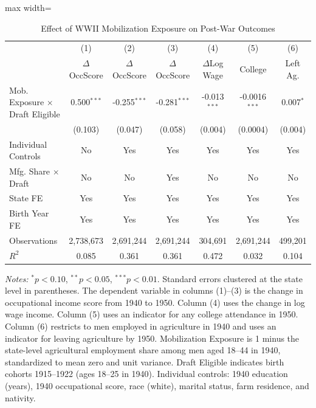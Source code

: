 \begin{table}[htbp]
\centering
\caption{Effect of WWII Mobilization Exposure on Post-War Outcomes}
\label{tab:main_results}
\begin{adjustbox}{max width=\textwidth}
\begin{tabular}{lcccccc}
\toprule
 & (1) & (2) & (3) & (4) & (5) & (6) \\
 & $\Delta$OccScore & $\Delta$OccScore & $\Delta$OccScore & $\Delta$Log Wage & College & Left Ag. \\
\midrule
Mob. Exposure $\times$ Draft Eligible & 0.500$^{***}$ & -0.255$^{***}$ & -0.281$^{***}$ & -0.013$^{***}$ & -0.0016$^{***}$ & 0.007$^{*}$ \\
 & (0.103) & (0.047) & (0.058) & (0.004) & (0.0004) & (0.004) \\
\midrule
Individual Controls & No & Yes & Yes & Yes & Yes & Yes \\
Mfg. Share $\times$ Draft & No & No & Yes & No & No & No \\
State FE & Yes & Yes & Yes & Yes & Yes & Yes \\
Birth Year FE & Yes & Yes & Yes & Yes & Yes & Yes \\
\midrule
Observations & 2,738,673 & 2,691,244 & 2,691,244 & 304,691 & 2,691,244 & 499,201 \\
$R^2$ & 0.085 & 0.361 & 0.361 & 0.472 & 0.032 & 0.104 \\
\bottomrule
\end{tabular}
\end{adjustbox}
\begin{tablenotes}
\small
\item \textit{Notes:} $^{*}p<0.10$, $^{**}p<0.05$, $^{***}p<0.01$. Standard errors clustered at the state level in parentheses. The dependent variable in columns (1)--(3) is the change in occupational income score from 1940 to 1950. Column (4) uses the change in log wage income. Column (5) uses an indicator for any college attendance in 1950. Column (6) restricts to men employed in agriculture in 1940 and uses an indicator for leaving agriculture by 1950. Mobilization Exposure is 1 minus the state-level agricultural employment share among men aged 18--44 in 1940, standardized to mean zero and unit variance. Draft Eligible indicates birth cohorts 1915--1922 (ages 18--25 in 1940). Individual controls: 1940 education (years), 1940 occupational score, race (white), marital status, farm residence, and nativity.
\end{tablenotes}
\end{table}
